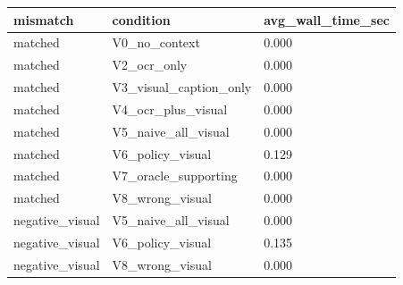 \begin{tabular}{lll}
\toprule
mismatch & condition & avg\_wall\_time\_sec \\
\midrule
matched & V0\_no\_context & 0.000 \\
matched & V2\_ocr\_only & 0.000 \\
matched & V3\_visual\_caption\_only & 0.000 \\
matched & V4\_ocr\_plus\_visual & 0.000 \\
matched & V5\_naive\_all\_visual & 0.000 \\
matched & V6\_policy\_visual & 0.129 \\
matched & V7\_oracle\_supporting & 0.000 \\
matched & V8\_wrong\_visual & 0.000 \\
negative\_visual & V5\_naive\_all\_visual & 0.000 \\
negative\_visual & V6\_policy\_visual & 0.135 \\
negative\_visual & V8\_wrong\_visual & 0.000 \\
\bottomrule
\end{tabular}
